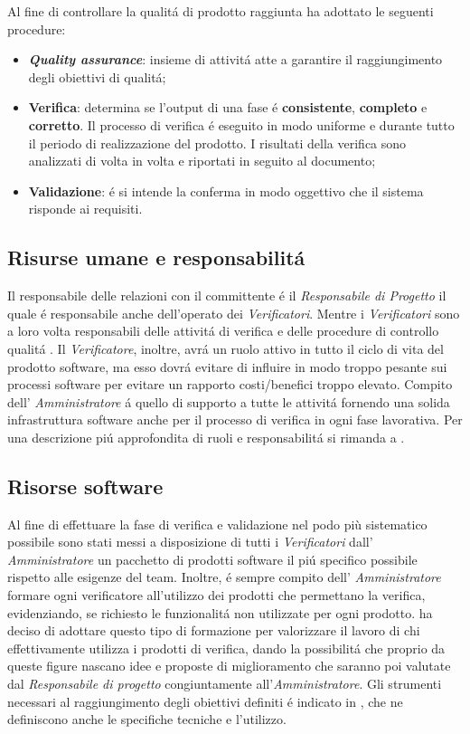 Al fine di controllare la qualit\'a di prodotto raggiunta \gruppo ha adottato le seguenti procedure:
\begin{itemize}
\item \textbf{\textit{Quality assurance}}: insieme di attivit\'a atte a garantire il raggiungimento degli obiettivi di qualit\'a;
\item \textbf{Verifica}: determina se l'output di una fase \'e \textbf{consistente}, \textbf{completo} e \textbf{corretto}. Il processo di verifica \'e eseguito in modo uniforme e durante tutto il periodo di realizzazione del prodotto. I risultati della verifica sono analizzati di volta in volta e riportati in seguito al documento;
\item \textbf{Validazione}: \'e si intende la conferma in modo oggettivo che il sistema risponde ai requisiti.
\end{itemize}
\subsection{Risurse umane e responsabilit\'a}
Il responsabile delle relazioni con il committente \'e il \textit{Responsabile di Progetto} il quale \'e responsabile anche dell'operato dei \textit{Verificatori}. Mentre i \textit{Verificatori} sono a loro volta responsabili delle attivit\'a di verifica e delle procedure di controllo qualit\'a . Il \textit{Verificatore}, inoltre, avr\'a un ruolo attivo in tutto il ciclo di vita del prodotto software, ma esso dovr\'a evitare di influire in modo troppo pesante sui processi software per evitare un rapporto costi/benefici troppo elevato. Compito dell' \textit{Amministratore} \'a quello di supporto a tutte le attivit\'a fornendo una solida infrastruttura software anche per il processo di verifica in ogni fase lavorativa.
Per una descrizione pi\'u approfondita di ruoli e responsabilit\'a si rimanda a \infoNDP.\\
\subsection{Risorse software}
Al fine di effettuare la fase di verifica e validazione nel podo più sistematico possibile sono stati messi a disposizione di tutti i \textit{Verificatori} dall' \textit{Amministratore} un pacchetto di prodotti software il pi\'u specifico possibile rispetto alle esigenze del team. Inoltre, \'e sempre compito dell' \textit{Amministratore} formare ogni verificatore all'utilizzo dei prodotti che permettano la verifica, evidenziando, se richiesto le funzionalit\'a non utilizzate per ogni prodotto. \gruppo{} ha deciso di adottare questo tipo di formazione per valorizzare il lavoro di chi effettivamente utilizza i prodotti di verifica, dando la possibilit\'a che proprio da queste figure nascano idee e proposte di miglioramento che saranno poi valutate dal \textit{Responsabile di progetto} congiuntamente all'\textit{Amministratore}.
Gli strumenti necessari al raggiungimento degli obiettivi definiti \'e indicato in \infoNDP, che ne definiscono anche le specifiche tecniche e l'utilizzo.
